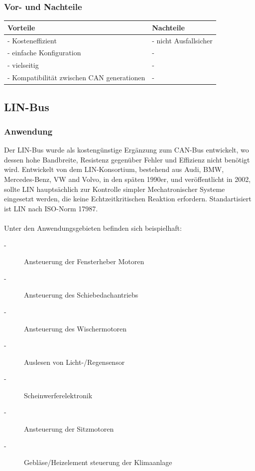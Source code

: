     \subsubsection{Vor- und Nachteile}
    \begin{center}
        \begin{tabular}{p{5.5cm} p{5.5cm}}
            \hline
            Vorteile & Nachteile\\
            \hline
            \hline - Kosteneffizient & - nicht Ausfallsicher\\
            \hline - einfache Konfiguration & - \\
            \hline - vielseitig & - \\
            \hline - Kompatibilität zwischen CAN generationen & - \\
            \hline
        \end{tabular}            
    \end{center}
    
\subsection{LIN-Bus}
    \subsubsection{Anwendung}
    Der LIN-Bus wurde als kostengünstige Ergänzung zum CAN-Bus entwickelt, wo dessen hohe
    Bandbreite, Resistenz gegenüber Fehler und Effizienz nicht benötigt wird. Entwickelt 
    von dem LIN-Konsortium, bestehend aus Audi, BMW, Mercedes-Benz, VW and Volvo, in den 
    späten 1990er, und veröffentlicht in 2002, sollte LIN hauptsächlich zur Kontrolle 
    simpler Mechatronischer Systeme eingesetzt werden, die keine Echtzeitkritischen Reaktion 
    erfordern. Standartisiert ist LIN nach ISO-Norm 17987.
    ~\cite{reif2011bosch}\\\\
    Unter den Anwendungsgebieten befinden sich beispielhaft:
    \begin{description}
    \item[-] Ansteuerung der Fensterheber Motoren
    \item[-] Ansteuerung des Schiebedachantriebs
    \item[-] Ansteuerung des Wischermotoren
    \item[-] Auslesen von Licht-/Regensensor
    \item[-] Scheinwerferelektronik
    \item[-] Ansteuerung der Sitzmotoren
    \item[-] Gebläse/Heizelement steuerung der Klimaanlage
    \end{description}


